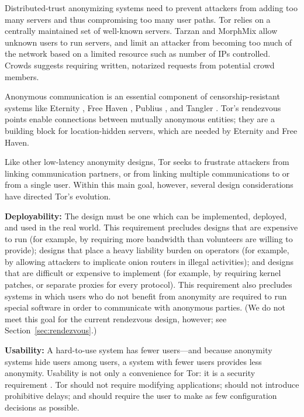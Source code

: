 \documentclass[times,10pt,twocolumn]{article}
\begin{document}
Distributed-trust anonymizing systems need to prevent attackers from
adding too many servers and thus compromising too many user paths.
Tor relies on a centrally maintained set of well-known servers. Tarzan
and MorphMix allow unknown users to run servers, and limit an attacker
from becoming too much of the network based on a limited resource such
as number of IPs controlled. Crowds suggests requiring written, notarized
requests from potential crowd members.

Anonymous communication is an essential component of censorship-resistant
systems like Eternity \cite{eternity}, Free Haven \cite{freehaven-berk},
Publius \cite{publius}, and Tangler \cite{tangler}. Tor's rendezvous
points enable connections between mutually anonymous entities; they
are a building block for location-hidden servers, which are needed by
Eternity and Free Haven.


\label{sec:assumptions}

Like other low-latency anonymity designs, Tor seeks to frustrate
attackers from linking communication partners, or from linking
multiple communications to or from a single user.  Within this
main goal, however, several design considerations have directed
Tor's evolution.

\textbf{Deployability:} The design must be one which can be implemented,
deployed, and used in the real world.  This requirement precludes designs
that are expensive to run (for example, by requiring more bandwidth
than volunteers are willing to provide); designs that place a heavy
liability burden on operators (for example, by allowing attackers to
implicate onion routers in illegal activities); and designs that are
difficult or expensive to implement (for example, by requiring kernel
patches, or separate proxies for every protocol).  This requirement also
precludes systems in which users who do not benefit from anonymity are
required to run special software in order to communicate with anonymous
parties. (We do not meet this goal for the current rendezvous design,
however; see Section~\ref{sec:rendezvous}.)

\textbf{Usability:} A hard-to-use system has fewer users---and because
anonymity systems hide users among users, a system with fewer users
provides less anonymity.  Usability is not only a convenience for Tor:
it is a security requirement \cite{econymics,back01}. Tor should not
require modifying applications; should not introduce prohibitive delays;
and should require the user to make as few configuration decisions
as possible.
\end{document}
